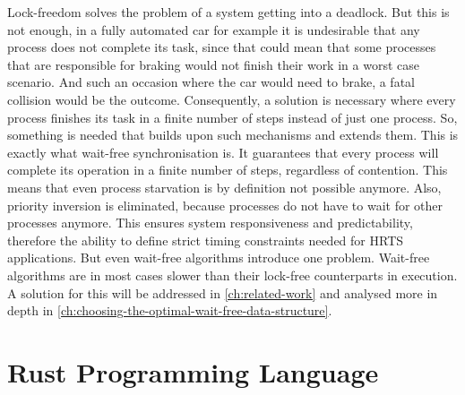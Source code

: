 Lock-freedom solves the problem of a system getting into a deadlock. But this is not enough, in a fully automated car for example it is undesirable that any process does not complete its task, since that could mean that some processes that are responsible for braking would not finish their work in a worst case scenario. And such an occasion where the car would need to brake, a fatal collision would be the outcome. Consequently, a solution is necessary where every process finishes its task in a finite number of steps instead of just one process. So, something is needed that builds upon such mechanisms and extends them. This is exactly what wait-free synchronisation is. It guarantees that every process will complete its operation in a finite number of steps, regardless of contention. This means that even process starvation is by definition not possible anymore. Also, priority inversion is eliminated, because processes do not have to wait for other processes anymore. This ensures system responsiveness and predictability, therefore the ability to define strict timing constraints needed for \ac{HRTS} applications. But even wait-free algorithms introduce one problem. Wait-free algorithms are in most cases slower than their lock-free counterparts in execution. A solution for this will be addressed in \cref{ch:related-work} and analysed more in depth in \cref{ch:choosing-the-optimal-wait-free-data-structure}.

\section{Rust Programming Language}\label{sec:rust}

